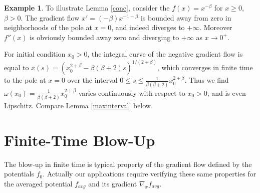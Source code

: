 \documentclass[12pt]{amsart}
\theoremstyle{definition}
\newtheorem{exx}{Example}
\theoremstyle{remark}
\begin{document}


\begin{exx} 
To illustrate Lemma \ref{conc}, consider the $f(x)=x^{-\beta}$ for $x\geq 0$, $\beta>0$. The gradient flow $x'= (-\beta)x^{-1-\beta}$ is bounded away from zero in neighborhoods of the pole at $x=0$, and indeed diverges to $+\infty$. Moreover $f''(x)$ is obviously bounded away zero and diverging to $+\infty$ as $x\to 0^+$. 

For initial condition $x_0>0$, the integral curve of the negative gradient flow is equal to $x(s)=(x_0^{2+\beta} - \beta(\beta+2)s)^{1/(2+\beta)}$, which converges in finite time to the pole at $x=0$ over the interval $0\leq s\leq \frac{1}{\beta(\beta+2)}x_0^{2+\beta}$. Thus we find $\omega(x_0)=\frac{1}{\beta(\beta+2)}x_0^{2+\beta}$ varies continuously with respect to $x_0>0$, and is even Lipschitz. Compare Lemma \ref{maxinterval} below. 

\end{exx}

\section{Finite-Time Blow-Up}


The blow-up in finite time is typical property of the gradient flow defined by the potentials $f_0$. Actually our applications require verifying these same properties for the averaged potential $f_{avg}$ and its gradient $\nabla_x f_{avg}$. 
\end{document}

